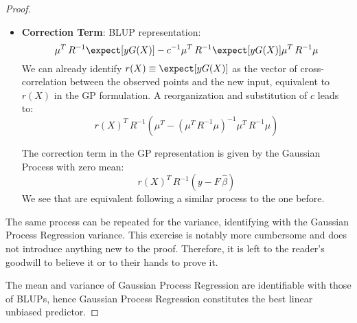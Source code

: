 \begin{proof}
\begin{itemize}
        \item \textbf{Correction Term}: BLUP representation:
        \begin{equation*}
            \mu^T\,R^{-1}\expect[yG(X)] - c^{-1}\mu^T\,R^{-1}\expect[yG(X)]\mu^T\,R^{-1}\mu
        \end{equation*}
        We can already identify $r(X) \equiv \expect[yG(X)]$ as the vector of cross-correlation between the observed points and the new input, {\color{niceBlue} equivalent to $r(X)$ in the GP formulation}. A reorganization and substitution of $c$ leads to:
        \begin{equation}
            r(X)^T\,R^{-1}\left(\mu^T - (\mu^T\,R^{-1}\mu)^{-1}\mu^T\,R^{-1}\mu\right)
            \label{eq:blup_correction}
        \end{equation}

        {\color{niceBlue}
        The correction term in the GP representation is given by the Gaussian Process with zero mean:
        \begin{equation}
            r(X)^T\,R^{-1}(y - F\,\hat{\beta})
            \label{eq:gp_correction}
        \end{equation}
        }
        We see that  are equivalent following a similar process to the one before.
    \end{itemize}

    The same process can be repeated for the variance, identifying  with the Gaussian Process Regression variance. This exercise is notably more cumbersome and does not introduce anything new to the proof. Therefore, it is left to the reader's goodwill to believe it or to their hands to prove it. 

    The mean and variance of Gaussian Process Regression are identifiable with those of BLUPs, hence Gaussian Process Regression constitutes the best linear unbiased predictor.    
\end{proof}